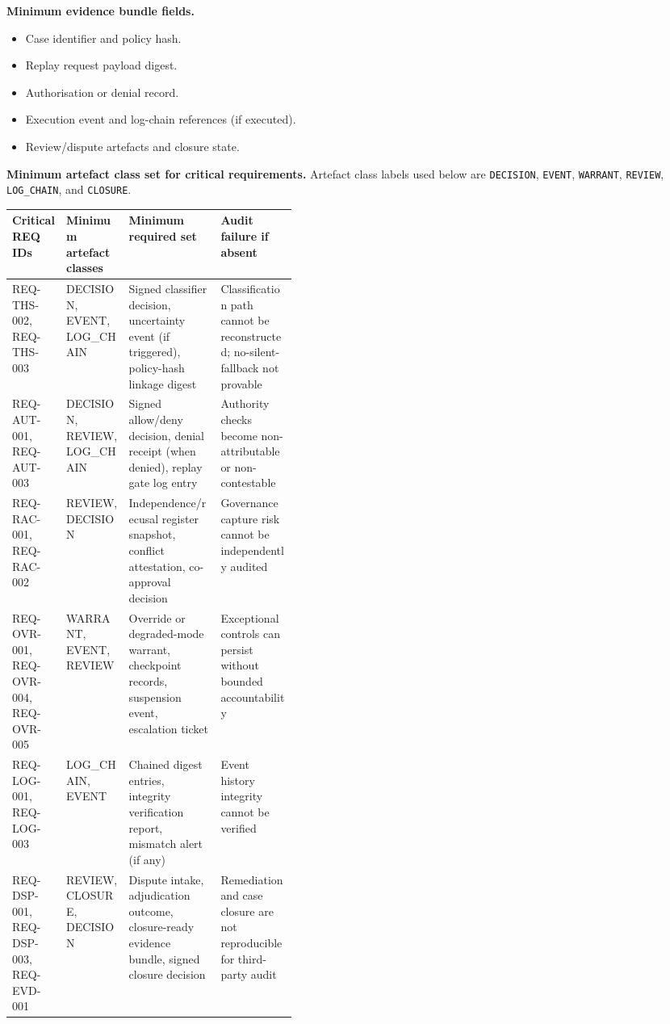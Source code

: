 \documentclass[11pt]{article}
\theoremstyle{definition}
\theoremstyle{plain}
\theoremstyle{remark}
\begin{document}
\textbf{Minimum evidence bundle fields.}
\begin{itemize}[leftmargin=*]
  \item Case identifier and policy hash.
  \item Replay request payload digest.
  \item Authorisation or denial record.
  \item Execution event and log-chain references (if executed).
  \item Review/dispute artefacts and closure state.
\end{itemize}

\textbf{Minimum artefact class set for critical requirements.}
Artefact class labels used below are \texttt{DECISION}, \texttt{EVENT}, \texttt{WARRANT},
\texttt{REVIEW}, \texttt{LOG\_CHAIN}, and \texttt{CLOSURE}.

\begin{center}
\small
\setlength{\tabcolsep}{5pt}
\renewcommand{\arraystretch}{1.22}
\begin{tabularx}{0.98\linewidth}{p{0.19\linewidth} p{0.22\linewidth} Y Y}
\textbf{Critical REQ IDs} & \textbf{Minimum artefact classes} & \textbf{Minimum required set} & \textbf{Audit failure if absent} \\ \hline
{}
REQ-THS-002, REQ-THS-003 & DECISION, EVENT, LOG\_CHAIN & Signed classifier decision, uncertainty event (if triggered), policy-hash linkage digest & Classification path cannot be reconstructed; no-silent-fallback not provable \\
REQ-AUT-001, REQ-AUT-003 & DECISION, REVIEW, LOG\_CHAIN & Signed allow/deny decision, denial receipt (when denied), replay gate log entry & Authority checks become non-attributable or non-contestable \\
REQ-RAC-001, REQ-RAC-002 & REVIEW, DECISION & Independence/recusal register snapshot, conflict attestation, co-approval decision & Governance capture risk cannot be independently audited \\
REQ-OVR-001, REQ-OVR-004, REQ-OVR-005 & WARRANT, EVENT, REVIEW & Override or degraded-mode warrant, checkpoint records, suspension event, escalation ticket & Exceptional controls can persist without bounded accountability \\
REQ-LOG-001, REQ-LOG-003 & LOG\_CHAIN, EVENT & Chained digest entries, integrity verification report, mismatch alert (if any) & Event history integrity cannot be verified \\
REQ-DSP-001, REQ-DSP-003, REQ-EVD-001 & REVIEW, CLOSURE, DECISION & Dispute intake, adjudication outcome, closure-ready evidence bundle, signed closure decision & Remediation and case closure are not reproducible for third-party audit \\
\end{tabularx}
\end{center}
\end{document}
